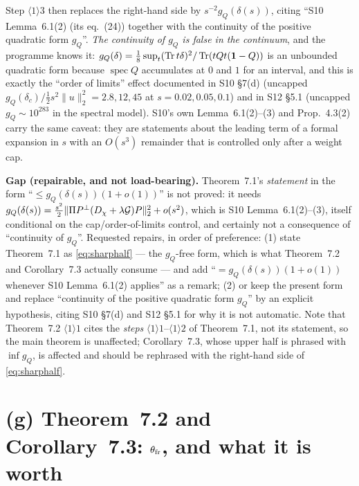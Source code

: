 \documentclass[11pt]{article}
\newcommand{\norm}[1]{\lVert #1\rVert}\newcommand{\abs}[1]{\lvert #1\rvert}
\begin{document}
Step $\langle1\rangle3$ then replaces the right-hand side by $s^{-2}g_Q(\delta(s))$, citing
``S10 Lemma~6.1(2) (its eq.~(24)) together with the continuity of the positive quadratic
form $g_Q$''.  \emph{The continuity of $g_Q$ is false in the continuum}, and the programme
knows it: $g_Q(\delta)=\tfrac18\sup_t(\operatorname{Tr} t\delta)^2/\operatorname{Tr}(tQt(\mathbf 1-Q))$ is an unbounded
quadratic form because $\operatorname{spec}Q$ accumulates at $0$ and $1$ for an interval,
and this is exactly the ``order of limits'' effect documented in S10 \S7(d) (uncapped
$g_Q(\delta_c)/\tfrac12s^2\norm u_2^2=2.8,12,45$ at $s=0.02,0.05,0.1$) and in S12 \S5.1
(uncapped $g_Q\sim10^{283}$ in the spectral model).  S10's own Lemma~6.1(2)--(3) and
Prop.~4.3(2) carry the same caveat: they are statements about the leading term of a formal
expansion in $s$ with an $O(s^3)$ remainder that is controlled only after a weight cap.

\begin{verdictgap}
\textbf{Gap (repairable, and not load-bearing).}  Theorem~7.1's \emph{statement} in the form
``$\le g_Q(\delta(s))(1+o(1))$'' is not proved: it needs
$g_Q(\delta(s))=\tfrac{s^2}2\norm{\Pi\Pperp(D_\chi+\lambda\Gs)P}_2^2+o(s^2)$, which is S10
Lemma~6.1(2)--(3), itself conditional on the cap/order-of-limits control, and certainly not
a consequence of ``continuity of $g_Q$''.  Requested repairs, in order of preference:
(1) state Theorem~7.1 as \eqref{eq:sharphalf} --- the $g_Q$-free form, which is what
Theorem~7.2 and Corollary~7.3 actually consume --- and add ``$=g_Q(\delta(s))(1+o(1))$
whenever S10 Lemma~6.1(2) applies'' as a remark; (2) or keep the present form and replace
``continuity of the positive quadratic form $g_Q$'' by an explicit hypothesis, citing S10
\S7(d) and S12 \S5.1 for why it is not automatic.  Note that Theorem~7.2 $\langle1\rangle1$
cites the \emph{steps} $\langle1\rangle1$--$\langle1\rangle2$ of Theorem~7.1, not its
statement, so the main theorem is unaffected; Corollary~7.3, whose upper half is phrased with
$\inf g_Q$, is affected and should be rephrased with the right-hand side of
\eqref{eq:sharphalf}.
\end{verdictgap}

\section{(g) Theorem~7.2 and Corollary~7.3: $\theta_{\rm fr}$, and what it is worth}\label{sec:g}
\end{document}
